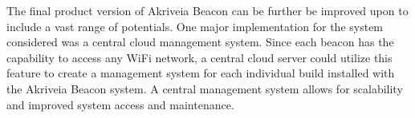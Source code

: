 \bigskip
The final product version of Akriveia Beacon can be further be improved upon to include a vast range of potentials. One major implementation for the system considered was a central cloud management system. Since each beacon has the capability to access any WiFi network, a central cloud server could utilize this feature to create a management system for each individual build installed with the Akriveia Beacon system. A central management system allows for scalability and improved system access and maintenance.




